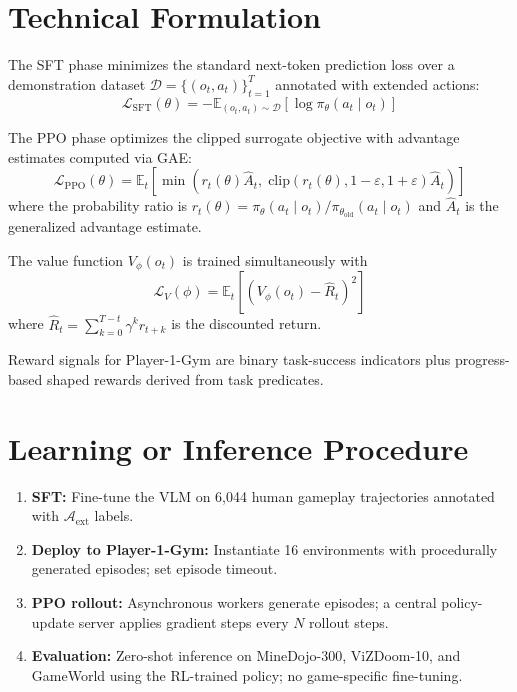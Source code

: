 \documentclass[10pt,twocolumn]{article}
\begin{document}
\section{Technical Formulation}

The SFT phase minimizes the standard next-token prediction loss over a
demonstration dataset $\mathcal{D} = \{(o_t, a_t)\}_{t=1}^T$ annotated with
extended actions:
\[
  \mathcal{L}_{\mathrm{SFT}}(\theta)
  = -\mathbb{E}_{(o_t, a_t) \sim \mathcal{D}}\!\left[\log \pi_\theta(a_t \mid o_t)\right]
\]

The PPO phase optimizes the clipped surrogate objective with advantage estimates
computed via GAE:
\[
  \mathcal{L}_{\mathrm{PPO}}(\theta)
  = \mathbb{E}_t\!\left[
    \min\!\left(
      r_t(\theta)\hat{A}_t,\;
      \mathrm{clip}\!\left(r_t(\theta), 1{-}\varepsilon, 1{+}\varepsilon\right)\hat{A}_t
    \right)
  \right]
\]
where the probability ratio is
$r_t(\theta) = \pi_\theta(a_t \mid o_t) / \pi_{\theta_{\mathrm{old}}}(a_t \mid o_t)$
and $\hat{A}_t$ is the generalized advantage estimate.

The value function $V_\phi(o_t)$ is trained simultaneously with
\[
  \mathcal{L}_V(\phi) = \mathbb{E}_t\!\left[\left(V_\phi(o_t) - \hat{R}_t\right)^2\right]
\]
where $\hat{R}_t = \sum_{k=0}^{T-t} \gamma^k r_{t+k}$ is the discounted return.

Reward signals for Player-1-Gym are binary task-success indicators plus
progress-based shaped rewards derived from task predicates.

\section{Learning or Inference Procedure}

\begin{enumerate}[itemsep=2pt,parsep=0pt]
  \item \textbf{SFT:} Fine-tune the VLM on 6,044 human gameplay trajectories
    annotated with $\mathcal{A}_{\mathrm{ext}}$ labels.
  \item \textbf{Deploy to Player-1-Gym:} Instantiate 16 environments with
    procedurally generated episodes; set episode timeout.
  \item \textbf{PPO rollout:} Asynchronous workers generate episodes; a central
    policy-update server applies gradient steps every $N$ rollout steps.
  \item \textbf{Evaluation:} Zero-shot inference on MineDojo-300, ViZDoom-10,
    and GameWorld using the RL-trained policy; no game-specific fine-tuning.
\end{enumerate}
\end{document}
